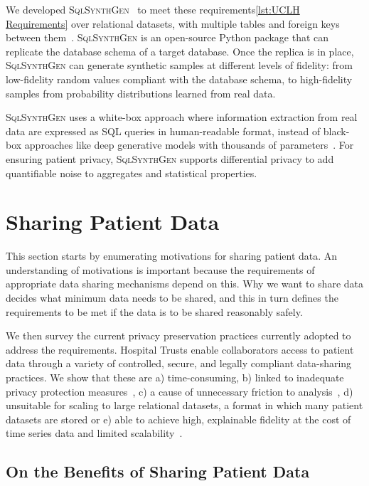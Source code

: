 \documentclass[11pt]{article}
\begin{document}
We developed \textsc{SqlSynthGen}~\cite{repository} to meet these requirements\ref{lst:UCLH Requirements} over relational datasets, with multiple tables and foreign keys between them~\cite{Cai2023}.
\textsc{SqlSynthGen} is an open-source Python package that can replicate the database schema of a target database. Once the replica is in place, \textsc{SqlSynthGen} can generate synthetic samples at different levels of fidelity: from low-fidelity random values compliant with the database schema, to high-fidelity samples from probability distributions learned from real data.

\textsc{SqlSynthGen} uses a white-box approach where information extraction from real data are expressed as SQL queries in human-readable format, instead of black-box approaches like deep generative models with thousands of parameters~\cite{DBLP:journals/pami/Bond-TaylorLLW22}. For ensuring patient privacy, \textsc{SqlSynthGen} supports differential privacy to add quantifiable noise to aggregates and statistical properties.

\section{Sharing Patient Data}

This section starts by enumerating motivations for sharing patient data. An understanding of motivations is important because the requirements of appropriate data sharing mechanisms depend on this. Why we want to share data decides what minimum data needs to be shared, and this in turn defines the requirements to be met if the data is to be shared reasonably safely.

We then survey the current privacy preservation practices currently adopted to address the requirements. Hospital Trusts enable collaborators access to patient data through a variety of controlled, secure, and legally compliant data-sharing practices.  We show that these are  a) time-consuming, b) linked to inadequate privacy protection measures~\cite{near2021, tucker2020}, c) a cause of unnecessary friction to analysis~\cite{ODonovan2023}, d) unsuitable for scaling to large relational datasets, a format in which many patient datasets are stored or e) able to achieve high, explainable fidelity at the cost of time series data and limited scalability~\cite{Cai2023}.

\subsection{On the Benefits of Sharing Patient Data}
\end{document}
